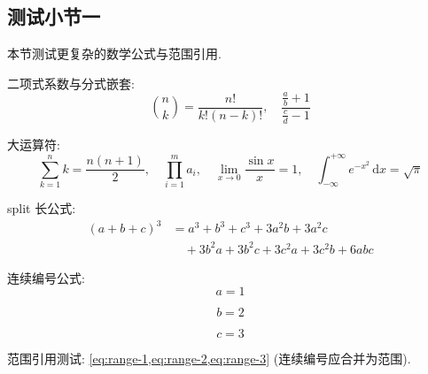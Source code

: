 \subsection{测试小节一}

本节测试更复杂的数学公式与范围引用.

二项式系数与分式嵌套:
\begin{equation}
    \binom{n}{k} = \frac{n!}{k!(n-k)!},
    \quad
    \frac{\frac{a}{b} + 1}{\frac{c}{d} - 1}
    \label{eq:binom-1}
\end{equation}

大运算符:
\begin{equation}
    \sum_{k=1}^{n} k = \frac{n(n+1)}{2},
    \quad
    \prod_{i=1}^{m} a_i,
    \quad
    \lim_{x \to 0} \frac{\sin x}{x} = 1,
    \quad
    \int_{-\infty}^{+\infty} e^{-x^2}\,\mathrm{d}x = \sqrt{\pi}
    \label{eq:bigop-1}
\end{equation}

split 长公式:
\begin{equation}
    \begin{split}
        (a+b+c)^3 &= a^3 + b^3 + c^3 + 3a^2b + 3a^2c \\
        &\quad + 3b^2a + 3b^2c + 3c^2a + 3c^2b + 6abc
    \end{split}
    \label{eq:split-1}
\end{equation}

连续编号公式:
\begin{equation}
    a = 1
    \label{eq:range-1}
\end{equation}

\begin{equation}
    b = 2
    \label{eq:range-2}
\end{equation}

\begin{equation}
    c = 3
    \label{eq:range-3}
\end{equation}

范围引用测试: \cref{eq:range-1,eq:range-2,eq:range-3} (连续编号应合并为范围).
